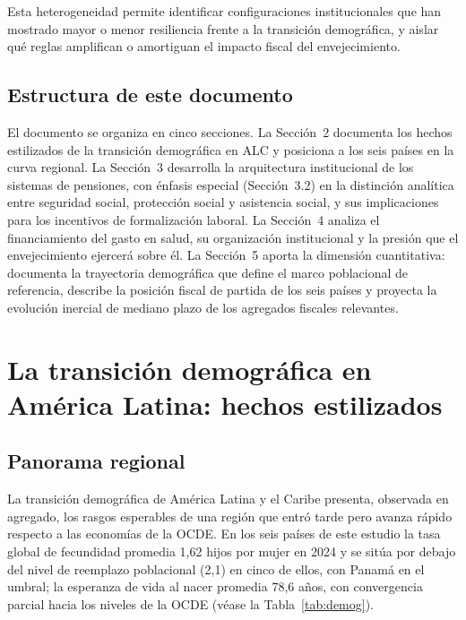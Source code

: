 \documentclass[12pt, letterpaper]{article}
\begin{document}
Esta heterogeneidad permite identificar configuraciones institucionales que han
mostrado mayor o menor resiliencia frente a la transición demográfica, y aislar
qué reglas amplifican o amortiguan el impacto fiscal del envejecimiento.

\subsection{Estructura de este documento}

El documento se organiza en cinco secciones. La Sección~2 documenta los hechos
estilizados de la transición demográfica en ALC y posiciona a los seis países en la
curva regional. La Sección~3 desarrolla la arquitectura institucional de los
sistemas de pensiones, con énfasis especial (Sección~3.2) en la distinción
analítica entre seguridad social, protección social y asistencia social, y sus
implicaciones para los incentivos de formalización laboral. La Sección~4 analiza el
financiamiento del gasto en salud, su organización institucional y la presión que
el envejecimiento ejercerá sobre él. La Sección~5 aporta la dimensión cuantitativa:
documenta la trayectoria demográfica que define el marco poblacional de referencia,
describe la posición fiscal de partida de los seis países y proyecta la evolución
inercial de mediano plazo de los agregados fiscales relevantes.

\newpage

\section{La transición demográfica en América Latina: hechos estilizados}
\label{sec:demografia}

\subsection{Panorama regional}

La transición demográfica de América Latina y el Caribe presenta, observada en
agregado, los rasgos esperables de una región que entró tarde pero avanza rápido
respecto a las economías de la OCDE. En los seis países de este estudio la tasa
global de fecundidad promedia 1{,}62 hijos por mujer en 2024 y se sitúa por debajo
del nivel de reemplazo poblacional (2{,}1) en cinco de ellos, con Panamá en el
umbral; la esperanza de vida al nacer promedia 78{,}6 años, con convergencia
parcial hacia los niveles de la OCDE (véase la Tabla~\ref{tab:demog}).
\end{document}
